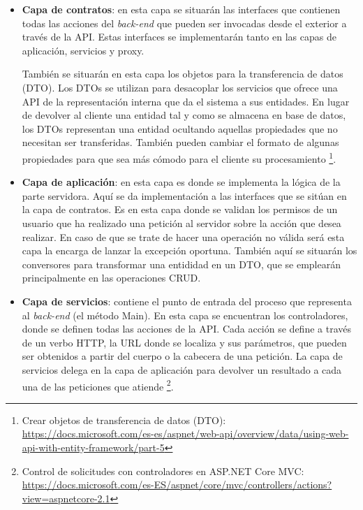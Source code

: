 \documentclass[11pt,spanish,listoffigures]{tfgetsinf}
\begin{document}
\begin{itemize}

\item \textbf{Capa de contratos}: en esta capa se situarán las interfaces que contienen todas las acciones del \textit{back-end} que pueden ser invocadas desde el exterior a través de la API. Estas interfaces se implementarán tanto en las capas de aplicación, servicios y proxy. 

También se situarán en esta capa los objetos para la transferencia de datos (DTO). Los DTOs se utilizan para desacoplar los servicios que ofrece una API de la representación interna que da el sistema a sus entidades. En lugar de devolver al cliente una entidad tal y como se almacena en base de datos, los DTOs representan una entidad ocultando aquellas propiedades que no necesitan ser transferidas. También pueden cambiar el formato de algunas propiedades para que sea más cómodo para el cliente su procesamiento \footnote{ Crear objetos de transferencia de datos (DTO): \url{https://docs.microsoft.com/es-es/aspnet/web-api/overview/data/using-web-api-with-entity-framework/part-5}}.

\item \textbf{Capa de aplicación}: en esta capa es donde se implementa la lógica de la parte servidora. Aquí se da implementación a las interfaces que se sitúan en la capa de contratos. Es en esta capa donde se validan los permisos de un usuario que ha realizado una petición al servidor sobre la acción que desea realizar. En caso de que se trate de hacer una operación no válida será esta capa la encarga de lanzar la excepción oportuna. También aquí se situarán los conversores para transformar una entididad en un DTO, que se emplearán principalmente en las operaciones CRUD.

\item \textbf{Capa de servicios}: contiene el punto de entrada del proceso que representa al \textit{back-end} (el método Main). En esta capa se encuentran los controladores, donde se definen todas las acciones de la API. Cada acción se define a través de un verbo HTTP, la URL donde se localiza y sus parámetros, que pueden ser obtenidos a partir del cuerpo o la cabecera de una petición. La capa de servicios delega en la capa de aplicación para devolver un resultado a cada una de las peticiones que atiende \footnote{ Control de solicitudes con controladores en ASP.NET Core MVC: \url{https://docs.microsoft.com/es-ES/aspnet/core/mvc/controllers/actions?view=aspnetcore-2.1}}.


\end{itemize}
\end{document}
